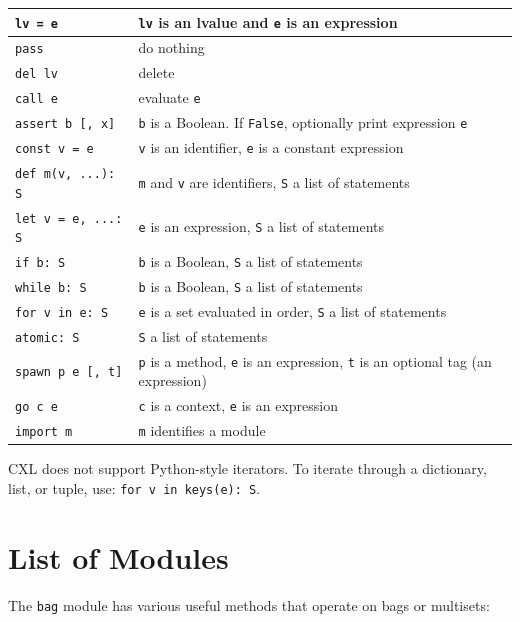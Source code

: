 \documentclass{report}
\begin{document}
\vspace{1em}
\begin{tabular}{|l|l|}
\hline
\texttt{lv = e} & \texttt{lv} is an lvalue and \texttt{e} is an expression\\
\hline
\texttt{pass} & do nothing\\
\hline
\texttt{del lv} & delete\\
\hline
\texttt{call e} & evaluate \texttt{e}\\
\hline
\texttt{assert b [, x]} & \texttt{b} is a Boolean.  If \texttt{False}, optionally print expression \texttt{e}\\
\hline
\texttt{const v = e} & \texttt{v} is an identifier, \texttt{e} is a constant expression\\
\hline
\texttt{def m(v, ...): S} & \texttt{m} and \texttt{v} are identifiers, \texttt{S} a list of statements\\
\hline
\texttt{let v = e, ...: S} & \texttt{e} is an expression, \texttt{S} a list of statements\\
\hline
\texttt{if b: S} & \texttt{b} is a Boolean, \texttt{S} a list of statements\\
\hline
\texttt{while b: S} & \texttt{b} is a Boolean, \texttt{S} a list of statements\\
\hline
\texttt{for v in e: S} & \texttt{e} is a set evaluated in order,
                            \texttt{S} a list of statements\\
\hline
\texttt{atomic: S} & \texttt{S} a list of statements\\
\hline
\texttt{spawn p e [, t]} & \texttt{p} is a method, \texttt{e} is an expression, \texttt{t} is an optional tag (an expression) \\
\hline
\texttt{go c e} & \texttt{c} is a context, \texttt{e} is an expression \\
\hline
\texttt{import m} & \texttt{m} identifies a module \\
\hline
\end{tabular}
\vspace{1em}

CXL does not support Python-style iterators.
To iterate through a dictionary, list, or tuple, use:
\texttt{for v in keys(e):~S}.

\chapter{List of Modules}

The \texttt{bag} module
has various useful methods that operate on bags or
multisets:
\end{document}
